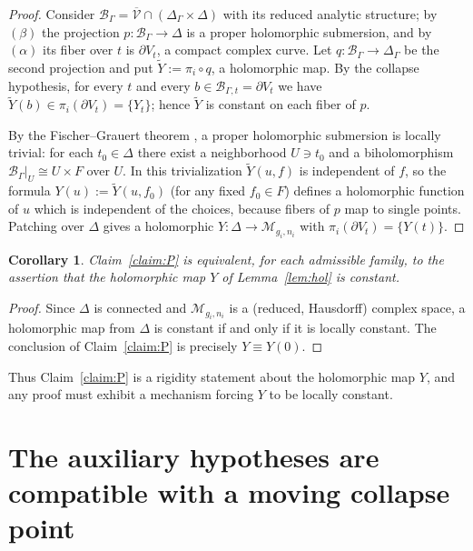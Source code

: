 \documentclass[11pt]{amsart}
\newcommand{\M}{\mathcal{M}}
\theoremstyle{plain}
\newtheorem{corollary}[theorem]{Corollary}
\theoremstyle{definition}
\theoremstyle{remark}
\begin{document}
\begin{proof}
Consider $\mathcal B_\Gamma=\overline{\mathcal V}\cap(\Delta_\Gamma\times\Delta)$
with its reduced analytic structure; by $(\beta)$ the projection
$p:\mathcal B_\Gamma\to\Delta$ is a proper holomorphic submersion, and by $(\alpha)$
its fiber over $t$ is $\partial V_t$, a compact complex curve. Let
$q:\mathcal B_\Gamma\to\Delta_\Gamma$ be the second projection and put
$\widetilde Y:=\pi_i\circ q$, a holomorphic map. By the collapse hypothesis, for
every $t$ and every $b\in\mathcal B_{\Gamma,t}=\partial V_t$ we have
$\widetilde Y(b)\in \pi_i(\partial V_t)=\{Y_t\}$; hence $\widetilde Y$ is constant on
each fiber of $p$.

By the Fischer--Grauert theorem \cite{FG}, a proper holomorphic submersion is locally
trivial: for each $t_0\in\Delta$ there exist a neighborhood $U\ni t_0$ and a
biholomorphism $\mathcal B_\Gamma|_U\cong U\times F$ over $U$. In this trivialization
$\widetilde Y(u,f)$ is independent of $f$, so the formula
$Y(u):=\widetilde Y(u,f_0)$ (for any fixed $f_0\in F$) defines a holomorphic function
of $u$ which is independent of the choices, because fibers of $p$ map to single
points. Patching over $\Delta$ gives a holomorphic $Y:\Delta\to\M_{g_i,n_i}$ with
$\pi_i(\partial V_t)=\{Y(t)\}$.
\end{proof}

\begin{corollary}\label{cor:equiv}
Claim~\ref{claim:P} is equivalent, for each admissible family, to the assertion that
the holomorphic map $Y$ of Lemma~\textup{\ref{lem:hol}} is constant.
\end{corollary}

\begin{proof}
Since $\Delta$ is connected and $\M_{g_i,n_i}$ is a (reduced, Hausdorff) complex
space, a holomorphic map from $\Delta$ is constant if and only if it is locally
constant. The conclusion of Claim~\ref{claim:P} is precisely $Y\equiv Y(0)$.
\end{proof}

Thus Claim~\ref{claim:P} is a rigidity statement about the holomorphic map $Y$, and
any proof must exhibit a mechanism forcing $Y$ to be locally constant.

\section{The auxiliary hypotheses are compatible with a moving collapse point}
\label{sec:model}
\end{document}
